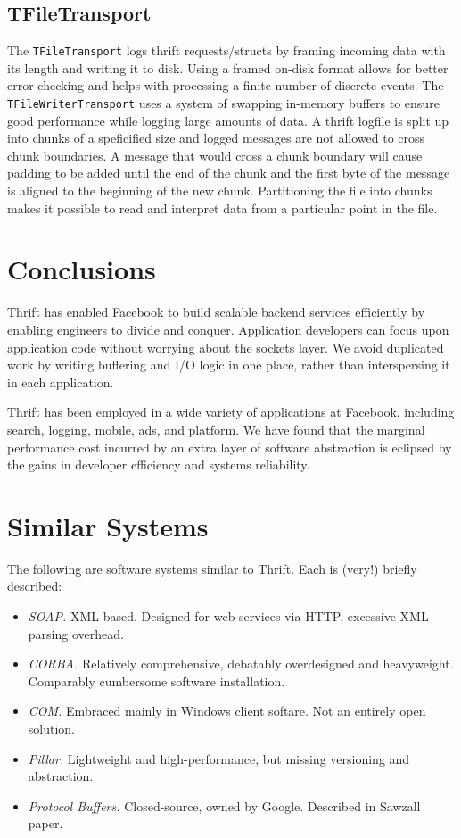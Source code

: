 \documentclass[nocopyrightspace,blockstyle]{sigplanconf}
\begin{document}
\subsection{TFileTransport}
The \texttt{TFileTransport} logs thrift requests/structs by 
framing incoming data with its length and writing it to disk. 
Using a framed on-disk format allows for better error checking and 
helps with processing a finite number of discrete events. The 
\texttt{TFileWriterTransport} uses a system of swapping in-memory buffers 
to ensure good performance while logging large amounts of data. 
A thrift logfile is split up into chunks of a speficified size and logged messages
are not allowed to cross chunk boundaries. A message that would cross a chunk 
boundary will cause padding to be added until the end of the chunk and the 
first byte of the message is aligned to the beginning of the new chunk.
Partitioning the file into chunks makes it possible to read and interpret data 
from a particular point in  the file. 

\section{Conclusions}
Thrift has enabled Facebook to build scalable backend
services efficiently by enabling engineers to divide and conquer. Application
developers can focus upon application code without worrying about the
sockets layer. We avoid duplicated work by writing buffering and I/O logic
in one place, rather than interspersing it in each application.

Thrift has been employed in a wide variety of applications at Facebook,
including search, logging, mobile, ads, and platform. We have
found that the marginal performance cost incurred by an extra layer of
software abstraction is eclipsed by the gains in developer efficiency and
systems reliability.

\appendix

\section{Similar Systems}
The following are software systems similar to Thrift. Each is (very!) briefly
described:

\begin{itemize}
\item \textit{SOAP.} XML-based. Designed for web services via HTTP, excessive
XML parsing overhead.
\item \textit{CORBA.} Relatively comprehensive, debatably overdesigned and
heavyweight. Comparably cumbersome software installation.
\item \textit{COM.} Embraced mainly in Windows client softare. Not an entirely
open solution.
\item \textit{Pillar.} Lightweight and high-performance, but missing versioning
and abstraction.
\item \textit{Protocol Buffers.} Closed-source, owned by Google. Described in
Sawzall paper.
\end{itemize}
\end{document}
